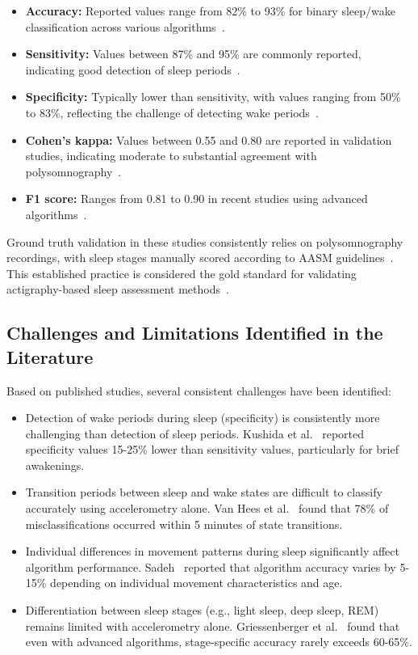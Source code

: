 \documentclass[conference]{IEEEtran}
\begin{document}
\begin{itemize}
	\item \textbf{Accuracy:} Reported values range from 82\% to 93\% for binary sleep/wake classification across various algorithms~\cite{zhang2020machine, vanHees2015}.
	\item \textbf{Sensitivity:} Values between 87\% and 95\% are commonly reported, indicating good detection of sleep periods~\cite{kushida2001, sadeh2011}.
	\item \textbf{Specificity:} Typically lower than sensitivity, with values ranging from 50\% to 83\%, reflecting the challenge of detecting wake periods~\cite{sadeh2011, vanHees2015}.
	\item \textbf{Cohen's kappa:} Values between 0.55 and 0.80 are reported in validation studies, indicating moderate to substantial agreement with polysomnography~\cite{sadeh2011, kushida2001}.
	\item \textbf{F1 score:} Ranges from 0.81 to 0.90 in recent studies using advanced algorithms~\cite{zhang2020machine, behar2013}.
\end{itemize}

Ground truth validation in these studies consistently relies on polysomnography recordings, with sleep stages manually scored according to AASM guidelines~\cite{aasm2007}. This established practice is considered the gold standard for validating actigraphy-based sleep assessment methods~\cite{littner2003}.

\subsection{Challenges and Limitations Identified in the Literature}
Based on published studies, several consistent challenges have been identified:

\begin{itemize}
	\item Detection of wake periods during sleep (specificity) is consistently more challenging than detection of sleep periods. Kushida et al.~\cite{kushida2001} reported specificity values 15-25\% lower than sensitivity values, particularly for brief awakenings.

	\item Transition periods between sleep and wake states are difficult to classify accurately using accelerometry alone. Van Hees et al.~\cite{vanHees2015} found that 78\% of misclassifications occurred within 5 minutes of state transitions.

	\item Individual differences in movement patterns during sleep significantly affect algorithm performance. Sadeh~\cite{sadeh2011} reported that algorithm accuracy varies by 5-15\% depending on individual movement characteristics and age.

	\item Differentiation between sleep stages (e.g., light sleep, deep sleep, REM) remains limited with accelerometry alone. Griessenberger et al.~\cite{griessenberger2013} found that even with advanced algorithms, stage-specific accuracy rarely exceeds 60-65\%.
\end{itemize}
\end{document}

